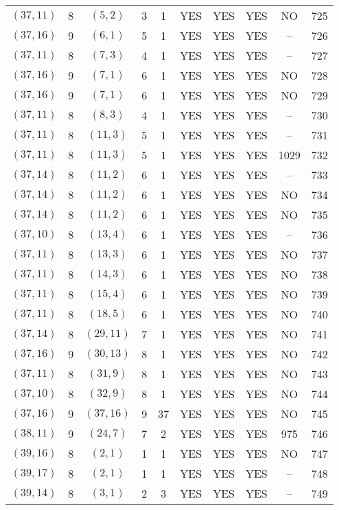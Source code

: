 \begin{longtable}{|c|c|c|c|c|c|c|c|c|c|}
$(37, 11)$ & 8 & $(5, 2)$ & 3 & 1 & YES & YES & YES & NO & 725\\
$(37, 16)$ & 9 & $(6, 1)$ & 5 & 1 & YES & YES & YES & -- & 726\\
$(37, 11)$ & 8 & $(7, 3)$ & 4 & 1 & YES & YES & YES & -- & 727\\
$(37, 16)$ & 9 & $(7, 1)$ & 6 & 1 & YES & YES & YES & NO & 728\\
$(37, 16)$ & 9 & $(7, 1)$ & 6 & 1 & YES & YES & YES & NO & 729\\
$(37, 11)$ & 8 & $(8, 3)$ & 4 & 1 & YES & YES & YES & -- & 730\\
$(37, 11)$ & 8 & $(11, 3)$ & 5 & 1 & YES & YES & YES & -- & 731\\
$(37, 11)$ & 8 & $(11, 3)$ & 5 & 1 & YES & YES & YES & 1029 & 732\\
$(37, 14)$ & 8 & $(11, 2)$ & 6 & 1 & YES & YES & YES & -- & 733\\
$(37, 14)$ & 8 & $(11, 2)$ & 6 & 1 & YES & YES & YES & NO & 734\\
$(37, 14)$ & 8 & $(11, 2)$ & 6 & 1 & YES & YES & YES & NO & 735\\
$(37, 10)$ & 8 & $(13, 4)$ & 6 & 1 & YES & YES & YES & -- & 736\\
$(37, 11)$ & 8 & $(13, 3)$ & 6 & 1 & YES & YES & YES & NO & 737\\
$(37, 11)$ & 8 & $(14, 3)$ & 6 & 1 & YES & YES & YES & NO & 738\\
$(37, 11)$ & 8 & $(15, 4)$ & 6 & 1 & YES & YES & YES & NO & 739\\
$(37, 11)$ & 8 & $(18, 5)$ & 6 & 1 & YES & YES & YES & NO & 740\\
$(37, 14)$ & 8 & $(29, 11)$ & 7 & 1 & YES & YES & YES & NO & 741\\
$(37, 16)$ & 9 & $(30, 13)$ & 8 & 1 & YES & YES & YES & NO & 742\\
$(37, 11)$ & 8 & $(31, 9)$ & 8 & 1 & YES & YES & YES & NO & 743\\
$(37, 10)$ & 8 & $(32, 9)$ & 8 & 1 & YES & YES & YES & NO & 744\\
$(37, 16)$ & 9 & $(37, 16)$ & 9 & 37 & YES & YES & YES & NO & 745\\
$(38, 11)$ & 9 & $(24, 7)$ & 7 & 2 & YES & YES & YES & 975 & 746\\
$(39, 16)$ & 8 & $(2, 1)$ & 1 & 1 & YES & YES & YES & NO & 747\\
$(39, 17)$ & 8 & $(2, 1)$ & 1 & 1 & YES & YES & YES & -- & 748\\
$(39, 14)$ & 8 & $(3, 1)$ & 2 & 3 & YES & YES & YES & -- & 749\\

\end{longtable}
